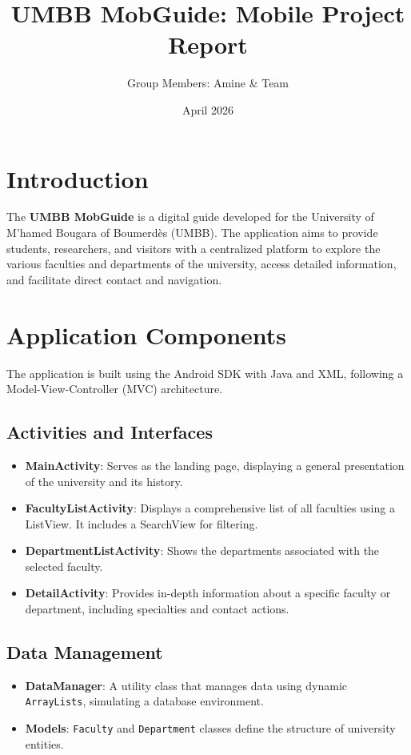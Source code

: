 \documentclass[12pt,a4paper]{article}
\title{UMBB MobGuide: Mobile Project Report}
\author{Group Members: Amine \& Team}
\date{April 2026}
\begin{document}
\maketitle

\section{Introduction}
The \textbf{UMBB MobGuide} is a digital guide developed for the University of M'hamed Bougara of Boumerdès (UMBB). The application aims to provide students, researchers, and visitors with a centralized platform to explore the various faculties and departments of the university, access detailed information, and facilitate direct contact and navigation.

\section{Application Components}
The application is built using the Android SDK with Java and XML, following a Model-View-Controller (MVC) architecture.

\subsection{Activities and Interfaces}
\begin{itemize}
    \item \textbf{MainActivity}: Serves as the landing page, displaying a general presentation of the university and its history.
    \item \textbf{FacultyListActivity}: Displays a comprehensive list of all faculties using a ListView. It includes a SearchView for filtering.
    \item \textbf{DepartmentListActivity}: Shows the departments associated with the selected faculty.
    \item \textbf{DetailActivity}: Provides in-depth information about a specific faculty or department, including specialties and contact actions.
\end{itemize}

\subsection{Data Management}
\begin{itemize}
    \item \textbf{DataManager}: A utility class that manages data using dynamic \texttt{ArrayLists}, simulating a database environment.
    \item \textbf{Models}: \texttt{Faculty} and \texttt{Department} classes define the structure of university entities.
\end{itemize}
\end{document}
